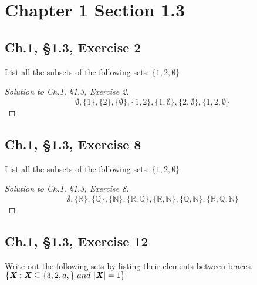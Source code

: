 \documentclass[12pt]{amsart}
\numberwithin{equation}{section}
\theoremstyle{definition}
\theoremstyle{remark}
\begin{document}



\section*{Chapter 1 Section 1.3}



\subsection*{Ch.1, \S 1.3,  Exercise 2} List all the subsets of the following sets: $ \{1, 2, \emptyset \} $


\begin{proof}[Solution to Ch.1, \S 1.3,  Exercise 2] 

$$
\emptyset, \{ 1 \}, \{ 2 \}, \{ \emptyset \}, \{ 1, 2 \}, \{ 1, \emptyset \}, \{ 2, \emptyset \}, \{ 1, 2, \emptyset \}
$$

\end{proof}




\subsection*{Ch.1, \S 1.3,  Exercise 8}  List all the subsets of the following sets: $ \{1, 2, \emptyset \} $ 


\begin{proof}[Solution to Ch.1, \S 1.3,  Exercise 8]

$$
\emptyset, \{ \mathbb{R} \}, \{ \mathbb{Q} \}, \{ \mathbb{N} \}, \{ \mathbb{R}, \mathbb{Q} \}, \{ \mathbb{R}, \mathbb{N} \}, \{ \mathbb{Q}, \mathbb{N} \}, \{ \mathbb{R}, \mathbb{Q}, \mathbb{N} \}
$$

\end{proof}




\subsection*{Ch.1, \S 1.3,  Exercise 12}  Write out the following sets by listing their elements between braces. $ \{ \textbf{\textit{X}} : \textbf{\textit{X}} \subseteq \{ 3, 2, a, \} \ and \ |\textbf{\textit{X}}| = 1 \} $
\end{document}

